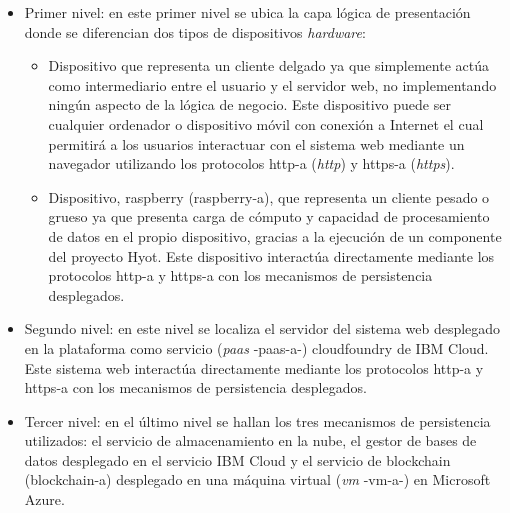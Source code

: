 \documentclass[12pt,a4paper, twoside]{report}
\begin{document}
	\begin{itemize}
		\item Primer nivel: en este primer nivel se ubica la capa lógica de presentación donde se diferencian dos tipos de dispositivos \textit{hardware}:
			\begin{itemize}
				\item Dispositivo que representa un cliente delgado ya que simplemente actúa como intermediario entre el usuario y el servidor web, no implementando ningún aspecto de la lógica de negocio. Este dispositivo puede ser cualquier ordenador o dispositivo móvil con conexión a Internet el cual permitirá a los usuarios interactuar con el sistema web mediante un navegador utilizando los protocolos \gls{http-a} (\textit{\gls{http}}) y \gls{https-a} (\textit{\gls{https}}).
				\item Dispositivo, \gls{raspberry} (\gls{raspberry-a}), que representa un cliente pesado o grueso ya que presenta carga de cómputo y capacidad de procesamiento de datos en el propio dispositivo, gracias a la ejecución de un componente del proyecto Hyot. Este dispositivo interactúa directamente mediante los protocolos \gls{http-a} y \gls{https-a} con los mecanismos de persistencia desplegados.
			\end{itemize}
				 		
		\item Segundo nivel: en este nivel se localiza el servidor del sistema web desplegado en la plataforma como servicio (\textit{\gls{paas}} -\gls{paas-a}-) \cite{gonzalez:2011:TCCS} \gls{cloudfoundry} de IBM Cloud. Este sistema web interactúa directamente mediante los protocolos \gls{http-a} y \gls{https-a} con los mecanismos de persistencia desplegados.
		
		\item Tercer nivel: en el último nivel se hallan los tres mecanismos de persistencia utilizados: el servicio de almacenamiento en la nube, el gestor de bases de datos desplegado en el servicio IBM Cloud y el servicio de \Gls{blockchain} (\gls{blockchain-a}) desplegado en una máquina virtual (\textit{\gls{vm}} -\gls{vm-a}-) en Microsoft Azure.
	\end{itemize}
	  
\end{document}
